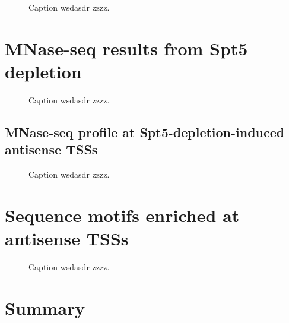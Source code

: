 \begin{figure}
\caption[Heatmaps of antisense TSS-seq, RNA-seq, and NET-seq signal from Spt5 depleted and non-depleted cells, over genes with Spt5-depletion-induced antisense TSSs.]{Caption wsdasdr zzzz.}
\end{figure}

\section{MNase-seq results from Spt5 depletion}

\begin{figure}
\caption[Average MNase-seq dyad signal from Spt5 depleted and non-depleted cells, over non-overlapping coding genes.]{Caption wsdasdr zzzz.}
\end{figure}

\subsection{MNase-seq profile at Spt5-depletion-induced antisense TSSs}

\begin{figure}
\caption[A figure showing MNase-seq signal around Spt5-depletion-induced antisense TSSs.]{Caption wsdasdr zzzz.}
\end{figure}

\section{Sequence motifs enriched at antisense TSSs}

\begin{figure}
\caption[A figure showing motifs enriched upstream of Spt5-depletion-induced antisense TSSs.]{Caption wsdasdr zzzz.}
\end{figure}

\section{Summary}


\newpage

\begingroup
\singlespacing

\endgroup
